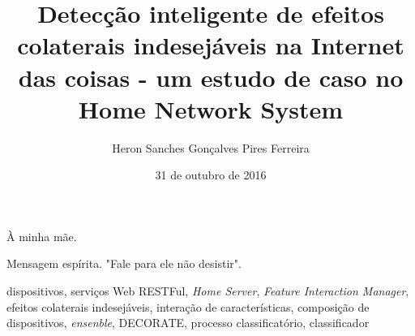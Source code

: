 \documentclass[bsc, classic, a4paper, oneside]{ufbathesis}
\institute{INSTITUTO DE MATEMÁTICA}
\title{Detecção inteligente de efeitos colaterais indesejáveis na Internet das coisas - um estudo de caso no Home Network System}
\date{31 de outubro de 2016}
\author{Heron Sanches Gonçalves Pires Ferreira}
\begin{document}
\pgcompfrontpage{}

\frontmatter

\pgcomppresentationpage

\catalogingsheet


\begin{dedicatory}
À minha mãe.
\end{dedicatory}

\acknowledgements


\begin{epigraph}{Mensagem espírita.}
  "Fale para ele não desistir".
\end{epigraph}

\resumo

\begin{keywords}
dispositivos, serviços Web RESTFul, \textit{Home Server}, \textit{Feature Interaction Manager}, efeitos colaterais indesejáveis, interação de características, composição de dispositivos, \textit{ensenble}, DECORATE, processo classificatório, classificador 
\end{keywords}
\end{document}
